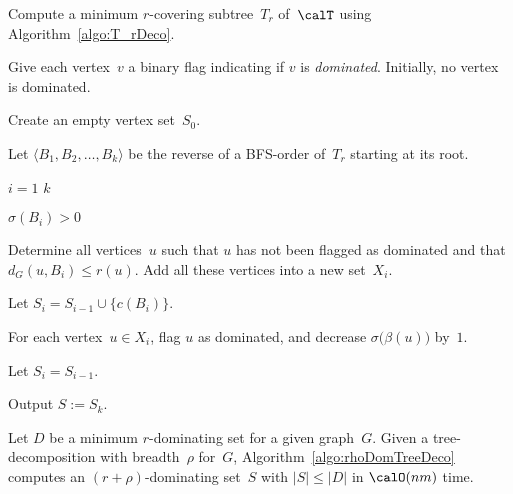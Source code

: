 \begin{algorithm}
    [htb]
    \caption
    {%
        Computes an $(r + \rho)$-dominating set~$S$ for a given graph~$G$ with a given tree-decomposition~$\calT$ with breadth~$\rho$.
    }
    \label{algo:rhoDomTreeDeco}

Compute a minimum $r$-covering subtree~$T_r$ of~$\calT$ using Algorithm~\ref{algo:T_rDeco}.
\label{line:computeTr}

Give each vertex~$v$ a binary flag indicating if $v$ is \emph{dominated}.
Initially, no vertex is dominated.

Create an empty vertex set~$S_0$.

Let $\langle B_1, B_2, \ldots, B_k \rangle$ be the reverse of a BFS-order of~$T_r$ starting at its root.
\label{line:computeBFSofTr}

\For
{%
    \( i = 1 \) \KwTo \( k \)
}
{%
    \If
    {%
        \( \sigma(B_i) > 0 \)
    }
    {%
        Determine all vertices~$u$ such that $u$ has not been flagged as dominated and that $d_G(u, B_i) \leq r(u)$.
        Add all these vertices into a new set~$X_i$.
        \label{line:determineXi}

        Let $S_i = S_{i - 1} \cup \big \{ c(B_i) \big \}$.

        For each vertex~$u \in X_i$, flag $u$ as dominated, and decrease $\sigma \big( \beta(u) \big)$ by~$1$.
        \label{line:flagVertex}
    }
    \Else
    {%
        Let $S_i = S_{i - 1}$.
        \label{line:setSi}
    }
}
Output $S := S_k$.
\end{algorithm}

\begin{theorem}
Let \( D \) be a minimum \( r \)-dominating set for a given graph~\( G \).
Given a tree-decomposition with breadth~\( \rho \) for~\( G \), Algorithm~\ref{algo:rhoDomTreeDeco} computes an \( (r + \rho) \)-dominating set~\( S \) with \( |S| \leq |D| \) in \( \calO(nm) \) time.
\end{theorem}

